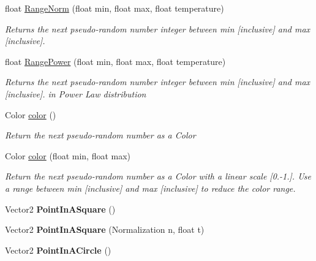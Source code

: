 \begin{DoxyCompactItemize}
float \hyperlink{class_m_t_random_a67f0856b5501a37b3ec078fbf0096754}{Range\+Norm} (float min, float max, float temperature)
\begin{DoxyCompactList}\small\item\em Returns the next pseudo-\/random number integer between {\itshape min}  \mbox{[}inclusive\mbox{]} and {\itshape max}  \mbox{[}inclusive\mbox{]}. \end{DoxyCompactList}\item 
float \hyperlink{class_m_t_random_aa7ab0237fc962a1f63e0a90c24db2ed2}{Range\+Power} (float min, float max, float temperature)
\begin{DoxyCompactList}\small\item\em Returns the next pseudo-\/random number integer between {\itshape min}  \mbox{[}inclusive\mbox{]} and {\itshape max}  \mbox{[}inclusive\mbox{]}. in Power Law distribution \end{DoxyCompactList}\item 
Color \hyperlink{class_m_t_random_adf641ad01fbd3c27a38f3047e59eb45d}{color} ()
\begin{DoxyCompactList}\small\item\em Return the next pseudo-\/random number as a Color \end{DoxyCompactList}\item 
Color \hyperlink{class_m_t_random_ae3f6b4f17b19399861d75f877e24d4f7}{color} (float min, float max)
\begin{DoxyCompactList}\small\item\em Return the next pseudo-\/random number as a Color with a linear scale \mbox{[}0.-\/1.\mbox{]}. Use a range between {\itshape min}  \mbox{[}inclusive\mbox{]} and {\itshape max}  \mbox{[}inclusive\mbox{]} to reduce the color range. \end{DoxyCompactList}\item 
\hypertarget{class_m_t_random_a28394b9419cee95f3b7cef5b269ef6df}{Vector2 {\bfseries Point\+In\+A\+Square} ()}\label{class_m_t_random_a28394b9419cee95f3b7cef5b269ef6df}

\item 
\hypertarget{class_m_t_random_a7ce51ff0fde5d9f0a508bdaa528a830c}{Vector2 {\bfseries Point\+In\+A\+Square} (Normalization n, float t)}\label{class_m_t_random_a7ce51ff0fde5d9f0a508bdaa528a830c}

\item 
\hypertarget{class_m_t_random_ad91aa159280b36e6eafb6eb9638b1cc1}{Vector2 {\bfseries Point\+In\+A\+Circle} ()}\label{class_m_t_random_ad91aa159280b36e6eafb6eb9638b1cc1}


\end{DoxyCompactItemize}

